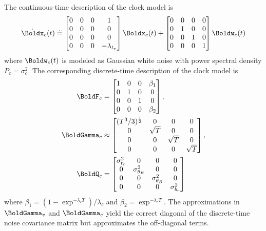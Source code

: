 \noindent
The continuous-time description of the clock model is 
\begin{align}
	\dot{\Boldx}_c(t) \doteq 
	\begin{bmatrix}
		0 & 0 & 0 & 1 \\
		0 & 0 & 0 & 0 \\ 
		0 & 0 & 0 & 0 \\  
		0 & 0 & 0 & -\lambda_{t_r}
	\end{bmatrix} 
	\Boldx_c(t) +
	\begin{bmatrix} 
		0 & 0 & 0 & 0 \\ 
		0 & 1 & 0 & 0 \\ 
		0 & 0 & 1 & 0 \\ 
		0 & 0 & 0 & 1 \\ 
	\end{bmatrix} 
	\Boldw_c(t)
\end{align}
where $\Boldw_c(t)$ is modeled as Gaussian white noise with power spectral density $P_c = \sigma_c^2$. 
The corresponding discrete-time description of the clock model is 
\begin{align}
	\BoldF_c &= 
	\begin{bmatrix}
		1 & 0 & 0 & \beta_1 \\ 
		0 & 1 & 0 & 0 \\
		0 & 0 & 1 & 0 \\
		0 & 0 & 0 & \beta_2
	\end{bmatrix}, ~ \\
	\BoldGamma_c & \approx
	\begin{bmatrix}
		(T^3 / 3)^{\frac{1}{2}} & 0 & 0 & 0 \\
		0 & \sqrt{T} & 0 & 0 \\
		0 & 0 & \sqrt{T} & 0 \\
		0 & 0 & 0 & \sqrt{T}
	\end{bmatrix}, \\ 
	\BoldQ_{c} &= 
	\begin{bmatrix}
		\sigma_{t_r}^2 & 0 & 0 & 0 \\
		0 & \sigma_{\theta_E}^2 & 0 & 0 \\
		0 & 0 & \sigma_{\theta_B}^2 & 0 \\ 
		0 & 0 & 0 & \sigma_{b_r}^2
	\end{bmatrix}
\end{align}
where $\beta_1 = (1 - \exp^{-\lambda_c T})/ \lambda_c$ and $\beta_2 = \exp^{-\lambda_c T}\!\!.$
The approximations in $\BoldGamma_v$ and $\BoldGamma_c$ yield the correct diagonal of the discrete-time noise covariance matrix but approximates the off-diagonal terms.

